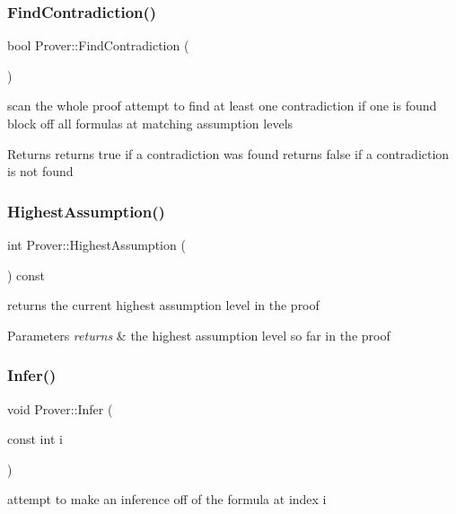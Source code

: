 \subsubsection{\texorpdfstring{Find\+Contradiction()}{FindContradiction()}}
{\footnotesize\ttfamily bool Prover\+::\+Find\+Contradiction (\begin{DoxyParamCaption}{ }\end{DoxyParamCaption})}

scan the whole proof attempt to find at least one contradiction if one is found block off all formulas at matching assumption levels \begin{DoxyReturn}{Returns}
returns true if a contradiction was found returns false if a contradiction is not found 
\end{DoxyReturn}
\mbox{\label{classProver_a98c85ede3242c56e7f7e7f3b42bbd191}} 
\subsubsection{\texorpdfstring{Highest\+Assumption()}{HighestAssumption()}}
{\footnotesize\ttfamily int Prover\+::\+Highest\+Assumption (\begin{DoxyParamCaption}{ }\end{DoxyParamCaption}) const}

returns the current highest assumption level in the proof 
\begin{DoxyParams}{Parameters}
{\em returns} & the highest assumption level so far in the proof \\
\hline
\end{DoxyParams}
\mbox{\label{classProver_a40376d5e8cc820b45b073dcc9320ed36}} 
\subsubsection{\texorpdfstring{Infer()}{Infer()}}
{\footnotesize\ttfamily void Prover\+::\+Infer (\begin{DoxyParamCaption}\item[{const int}]{i }\end{DoxyParamCaption})}

attempt to make an inference off of the formula at index i \mbox{\label{classProver_a046549fd07af6d0315a1d0df93215c60}} 
